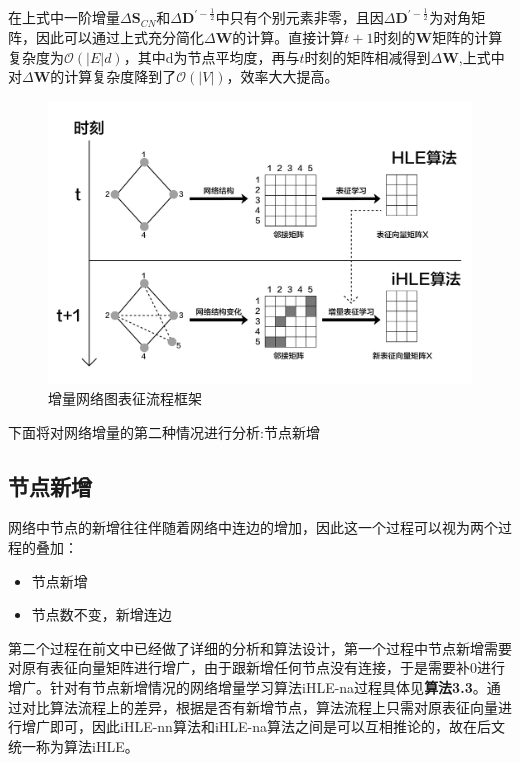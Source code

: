 在上式中一阶增量$\Delta\textbf{S}_{CN}$和$\Delta\textbf{D}^{\prime-\frac{1}{2}}$中只有个别元素非零，且因$\Delta\textbf{D}^{\prime-\frac{1}{2}}$为对角矩阵，因此可以通过上式充分简化$\Delta\textbf{W}$的计算。直接计算$t+1$时刻的\textbf{W}矩阵的计算复杂度为$\mathcal{O}(|E|d)$，其中d为节点平均度，再与$t$时刻的矩阵相减得到$\Delta\textbf{W}$,上式中对$\Delta\textbf{W}$的计算复杂度降到了$\mathcal{O}(|V|)$，效率大大提高。
\begin{figure}[htbp]
	\centering
	\includegraphics[width=6in]{figures/incremental_network_embedding}
	\caption{增量网络图表征流程框架}
	\label{fig:incremental_network_embedding}
\end{figure}

下面将对网络增量的第二种情况进行分析:节点新增
\subsection{节点新增}
网络中节点的新增往往伴随着网络中连边的增加，因此这一个过程可以视为两个过程的叠加：
\begin{itemize}
	\item 节点新增
	\item 节点数不变，新增连边
\end{itemize}
第二个过程在前文中已经做了详细的分析和算法设计，第一个过程中节点新增需要对原有表征向量矩阵进行增广，由于跟新增任何节点没有连接，于是需要补0进行增广。针对有节点新增情况的网络增量学习算法iHLE-na过程具体见\textbf{算法3.3}。通过对比算法流程上的差异，根据是否有新增节点，算法流程上只需对原表征向量进行增广即可，因此iHLE-nn算法和iHLE-na算法之间是可以互相推论的，故在后文统一称为算法iHLE。

